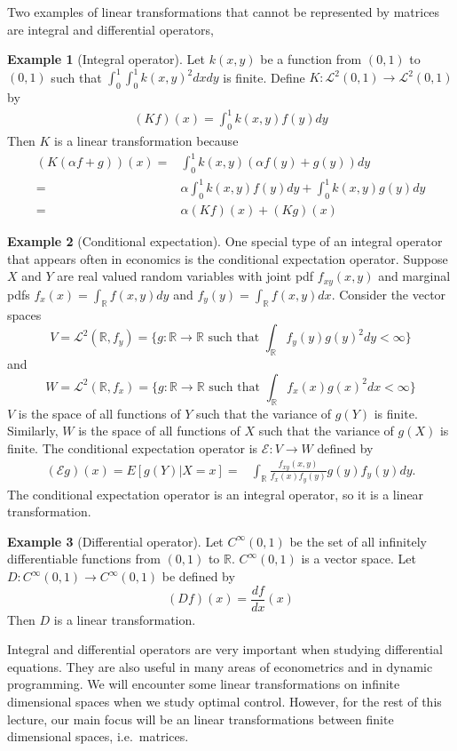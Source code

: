 \documentclass[12pt,reqno]{amsart}
\def\R{\mathbb{R}}
\theoremstyle{definition}
\newtheorem{example}{Example}[section]
\begin{document}
Two examples of linear transformations that cannot be represented by
matrices are integral and differential operators,
\begin{example}[Integral operator]
  Let $k(x,y)$ be a function from $(0,1)$ to $(0,1)$ such that
  $\int_0^1 \int_0^1 k(x,y)^2 dx dy$ is finite.  Define
  $K:\mathcal{L}^2(0,1) \rightarrow \mathcal{L}^2(0,1)$ by
  \begin{align*}
    (K f) (x) = \int_0^1 k(x,y) f(y) dy
  \end{align*}
  Then $K$ is a linear transformation because
  \begin{align*}
    (K ( \alpha f + g) ) (x) = & \int_0^1 k(x,y) (\alpha f(y) + g(y))dy
    \\
    = & \alpha \int_0^1 k(x,y) f(y) dy + \int_0^1 k(x,y) g(y)dy \\
    = & \alpha (K f) (x) + (K g)(x) 
  \end{align*}      
\end{example}

\begin{example}[Conditional expectation]
  One special type of an integral operator that appears often in
  economics is the conditional expectation operator. Suppose $X$ and
  $Y$ are real valued random variables with joint pdf $f_{xy}(x,y)$
  and marginal pdfs $f_x(x) = \int_\R f(x,y) dy$ and $f_y(y) = \int_\R
  f(x,y) dx$. Consider the vector spaces 
  \[ 
  V = \mathcal{L}^2(\R,f_y) = \{g:
  \R \to \R \text{ such that } \int_{\R} f_y(y) g(y)^2 dy <
  \infty \} \]
  and 
  \[ 
  W = \mathcal{L}^2(\R,f_x) = \{g:
  \R \to \R \text{ such that } \int_{\R} f_x(x) g(x)^2 dx <
  \infty \} 
  \]  
  $V$ is the space of all functions of $Y$ such that the variance of
  $g(Y)$ is finite. Similarly, $W$ is the space of all functions of
  $X$ such that the variance of $g(X)$ is finite. 
  The conditional expectation operator is $\mathcal{E}: V \to W$
  defined by 
  \begin{align*}
    (\mathcal{E} g)(x) = E[g(Y) | X = x] = & \int_\R
    \frac{f_{xy}(x,y)}{f_x(x) f_y(y)} g(y) f_y(y) dy.
  \end{align*}
  The conditional expectation operator is an integral operator, so it
  is a linear transformation. 
\end{example}

\begin{example}[Differential operator]
  Let $C^\infty(0,1)$ be the set of all infinitely differentiable
  functions from $(0,1)$ to $\R$. $C^\infty(0,1)$ is a vector space.
  Let $D:C^\infty(0,1) \rightarrow C^\infty(0,1)$ be defined by
  \[ (D f) (x) = \frac{d f}{dx}(x) \]
  Then $D$ is a linear transformation.
\end{example}
Integral and differential operators are very important when studying
differential equations.  They are also useful in many areas of
econometrics and in dynamic programming. We will encounter some linear
transformations on infinite dimensional spaces when we study optimal
control. However, for the rest of this lecture, our main focus will be
an linear transformations between finite dimensional spaces,
i.e.\ matrices. 
\end{document}
